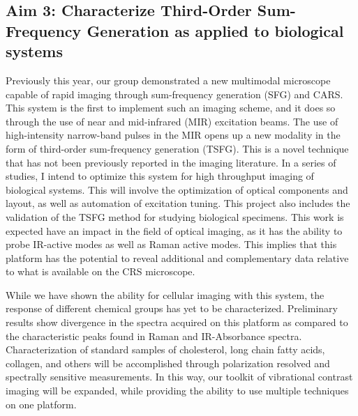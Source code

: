 \subsection{Aim 3: Characterize Third-Order Sum-Frequency Generation as applied to biological systems }
Previously this year, our group demonstrated a new multimodal microscope capable of rapid imaging through sum-frequency generation (SFG) and CARS.~\cite{8378261, Hanninen:18}  This system is the first to implement such an imaging scheme, and it does so through the use of near and mid-infrared (MIR) excitation beams.  The use of high-intensity narrow-band pulses in the MIR opens up a new modality in the form of third-order sum-frequency generation (TSFG).  This is a novel technique that has not been previously reported in the imaging literature.  In a series of studies, I intend to optimize this system for high throughput imaging of biological systems. This will involve the optimization of optical components and layout, as well as automation of excitation tuning.  This project also includes the validation of the TSFG method for studying biological specimens. This work is expected have an impact in the field of optical imaging, as it has the ability to probe IR-active modes as well as Raman active modes. This implies that this platform has the potential to reveal additional and complementary data relative to what is available on the CRS microscope.  

While we have shown the ability for cellular imaging with this system, the response of different chemical groups has yet to be characterized. Preliminary results show divergence in the spectra acquired on this platform as compared to the characteristic peaks found in Raman and IR-Absorbance spectra. Characterization of standard samples of cholesterol, long chain fatty acids, collagen, and others will be accomplished through polarization resolved and spectrally sensitive measurements.  In this way, our toolkit of vibrational contrast imaging will be expanded, while providing the ability to use multiple techniques on one platform.
